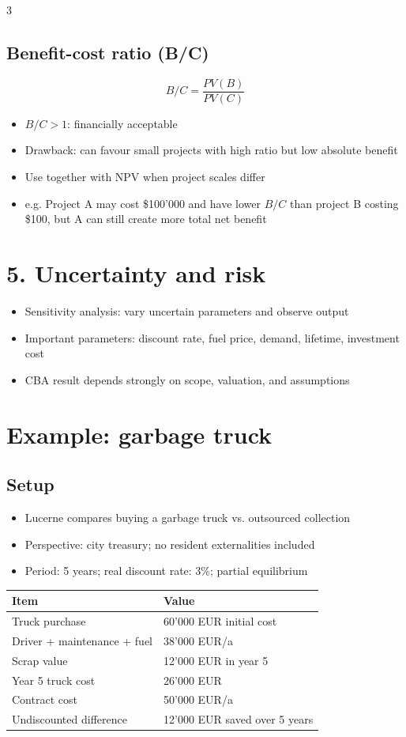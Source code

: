 \documentclass[9pt, landscape, a4paper]{article}
\begin{document}
\begin{multicols*}{3}
\subsection{Benefit-cost ratio (B/C)}
\[B/C = \frac{PV(B)}{PV(C)}\]
\begin{itemize}
  \item $B/C>1$: financially acceptable
  \item Drawback: can favour small projects with high ratio but low absolute benefit
  \item Use together with NPV when project scales differ
  \item e.g. Project A may cost \$100'000 and have lower $B/C$ than project B costing \$100, but A can still create more total net benefit
\end{itemize}

\section{5. Uncertainty and risk}
\begin{itemize}
  \item Sensitivity analysis: vary uncertain parameters and observe output
  \item Important parameters: discount rate, fuel price, demand, lifetime, investment cost
  \item CBA result depends strongly on scope, valuation, and assumptions
\end{itemize}

\newcolumn
\section{Example: garbage truck}
\subsection{Setup}
\begin{itemize}
  \item Lucerne compares buying a garbage truck vs. outsourced collection
  \item Perspective: city treasury; no resident externalities included
  \item Period: 5 years; real discount rate: 3\%; partial equilibrium
\end{itemize}

{\footnotesize
\begin{tabularx}{\columnwidth}{@{}lX@{}}
  \toprule
  \textbf{Item} & \textbf{Value}\\
  \midrule
  Truck purchase & 60'000 EUR initial cost\\
  Driver + maintenance + fuel & 38'000 EUR/a\\
  Scrap value & 12'000 EUR in year 5\\
  Year 5 truck cost & 26'000 EUR\\
  Contract cost & 50'000 EUR/a\\
  Undiscounted difference & 12'000 EUR saved over 5 years\\
  \bottomrule
\end{tabularx}}


\end{multicols*}
\end{document}
